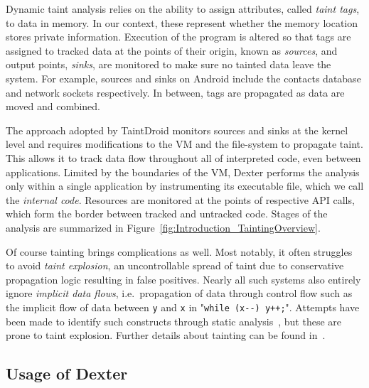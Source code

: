 \documentclass[12pt,twoside,notitlepage]{report}
\begin{document}
Dynamic taint analysis relies on the ability to assign attributes, called \emph{taint tags}, to data in memory. In our context, these represent whether the memory location stores private information. Execution of the program is altered so that tags are assigned to tracked data at the points of their origin, known as \emph{sources}, and output points, \emph{sinks}, are monitored to make sure no tainted data leave the system. For example, sources and sinks on Android include the contacts database and network sockets respectively. In between, tags are propagated as data are moved and combined. 

The approach adopted by TaintDroid monitors sources and sinks at the kernel level and requires modifications to the VM and the file-system to propagate taint. This allows it to track data flow throughout all of interpreted code, even between applications. Limited by the boundaries of the VM, Dexter performs the analysis only within a single application by instrumenting its executable file, which we call the \emph{internal code}. Resources are monitored at the points of respective API calls, which form the border between tracked and untracked code. Stages of the analysis are summarized in Figure~\ref{fig:Introduction_TaintingOverview}. 

Of course tainting brings complications as well. Most notably, it often struggles to avoid \emph{taint explosion}, an uncontrollable spread of taint due to conservative propagation logic resulting in false positives. Nearly all such systems also entirely ignore \emph{implicit data flows}, i.e.\ propagation of data through control flow such as the implicit flow of data between \texttt{y} and \texttt{x} in "\verb$while (x--) y++;$". Attempts have been made to identify such constructs through static analysis~\cite{Nair:2008:VMB:1346355.1346524}, but these are prone to taint explosion. Further details about tainting can be found in~\cite{Schwartz:2010:YEW:1849417.1849981, Ermolinskiy:EECS-2010-92}.

\subsection{Usage of Dexter}

\end{document}
